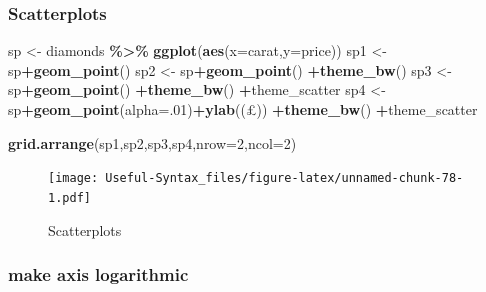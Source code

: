 \documentclass[
]{article}
\newenvironment{Shaded}{\begin{snugshade}}{\end{snugshade}}
\newcommand{\AttributeTok}[1]{\textcolor[rgb]{0.13,0.29,0.53}{#1}}
\newcommand{\DecValTok}[1]{\textcolor[rgb]{0.00,0.00,0.81}{#1}}
\newcommand{\FunctionTok}[1]{\textcolor[rgb]{0.13,0.29,0.53}{\textbf{#1}}}
\newcommand{\NormalTok}[1]{#1}
\newcommand{\OtherTok}[1]{\textcolor[rgb]{0.56,0.35,0.01}{#1}}
\newcommand{\SpecialCharTok}[1]{\textcolor[rgb]{0.81,0.36,0.00}{\textbf{#1}}}
\newcommand{\StringTok}[1]{\textcolor[rgb]{0.31,0.60,0.02}{#1}}
\begin{document}
\hypertarget{scatterplots}{%
\subsubsection{Scatterplots}\label{scatterplots}}

\begin{Shaded}
\begin{Highlighting}[]
\NormalTok{sp }\OtherTok{\textless{}{-}}\NormalTok{ diamonds }\SpecialCharTok{\%\textgreater{}\%} \FunctionTok{ggplot}\NormalTok{(}\FunctionTok{aes}\NormalTok{(}\AttributeTok{x=}\NormalTok{carat,}\AttributeTok{y=}\NormalTok{price))}
\NormalTok{sp1 }\OtherTok{\textless{}{-}}\NormalTok{ sp}\SpecialCharTok{+}\FunctionTok{geom\_point}\NormalTok{()}
\NormalTok{sp2 }\OtherTok{\textless{}{-}}\NormalTok{ sp}\SpecialCharTok{+}\FunctionTok{geom\_point}\NormalTok{() }\SpecialCharTok{+}\FunctionTok{theme\_bw}\NormalTok{()}
\NormalTok{sp3 }\OtherTok{\textless{}{-}}\NormalTok{ sp}\SpecialCharTok{+}\FunctionTok{geom\_point}\NormalTok{() }\SpecialCharTok{+}\FunctionTok{theme\_bw}\NormalTok{() }\SpecialCharTok{+}\NormalTok{theme\_scatter}
\NormalTok{sp4 }\OtherTok{\textless{}{-}}\NormalTok{ sp}\SpecialCharTok{+}\FunctionTok{geom\_point}\NormalTok{(}\AttributeTok{alpha=}\NormalTok{.}\DecValTok{01}\NormalTok{)}\SpecialCharTok{+}\FunctionTok{ylab}\NormalTok{(}\StringTok{\textquotesingle{}(£)\textquotesingle{}}\NormalTok{) }\SpecialCharTok{+}\FunctionTok{theme\_bw}\NormalTok{() }\SpecialCharTok{+}\NormalTok{theme\_scatter}


\FunctionTok{grid.arrange}\NormalTok{(sp1,sp2,sp3,sp4,}\AttributeTok{nrow=}\DecValTok{2}\NormalTok{,}\AttributeTok{ncol=}\DecValTok{2}\NormalTok{)}
\end{Highlighting}
\end{Shaded}

\begin{figure}
\centering
\texttt{[image: Useful-Syntax\_files/figure-latex/unnamed-chunk-78-1.pdf]}
\caption{\label{fig:unnamed-chunk-78}Scatterplots}
\end{figure}

\hypertarget{make-axis-logarithmic}{%
\subsubsection{make axis logarithmic}\label{make-axis-logarithmic}}
\end{document}
